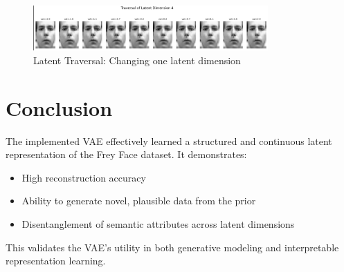 \documentclass[12pt]{article}
\begin{document}
\begin{figure}
    \centering
    \includegraphics[width=0.8\textwidth]{travel_latent4.png}
    \caption{Latent Traversal: Changing one latent dimension }
\end{figure}

\section*{Conclusion}

The implemented VAE effectively learned a structured and continuous latent representation of the Frey Face dataset. It demonstrates:
\begin{itemize}
    \item High reconstruction accuracy
    \item Ability to generate novel, plausible data from the prior
    \item Disentanglement of semantic attributes across latent dimensions
\end{itemize}
This validates the VAE’s utility in both generative modeling and interpretable representation learning.
\end{document}
